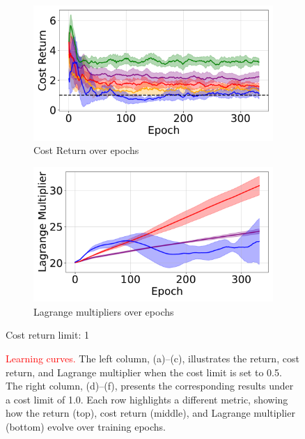 \begin{figure}[H]
\begin{minipage}{0.48\textwidth}
        \begin{subfigure}{\linewidth}
            \centering
            \includegraphics[width=\linewidth]{figure/PointGoal/limit 1/EpCost.pdf}
            \caption{Cost Return over epochs}
        \end{subfigure}

        \begin{subfigure}{\linewidth}
            \centering
            \includegraphics[width=\linewidth]{figure/PointGoal/limit 1/lagrange.pdf}
            \caption{Lagrange multipliers over epochs}
        \end{subfigure}

        \caption*{Cost return limit: 1}
    \end{minipage}

    \caption{\textcolor{red}{Learning curves.} 
    The left column, (a)–(c), illustrates the return, cost return, and Lagrange multiplier when the cost limit is set to 0.5. 
    The right column, (d)–(f), presents the corresponding results under a cost limit of 1.0. 
    Each row highlights a different metric, showing how the return (top), cost return (middle), and Lagrange multiplier (bottom) evolve over training epochs.}
    \label{fig:point_goal_results_vertical1}
\end{figure}

